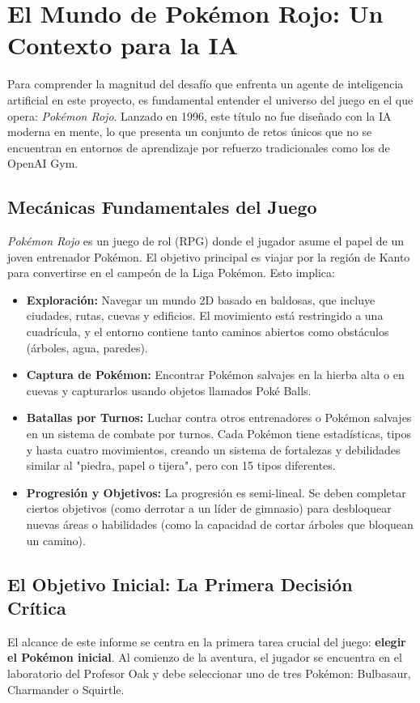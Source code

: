 \documentclass[12pt, oneside, openany]{book}
\begin{document}
\section{El Mundo de Pokémon Rojo: Un Contexto para la IA}
\label{sec:contexto_pokemon}

Para comprender la magnitud del desafío que enfrenta un agente de inteligencia artificial en este proyecto, es fundamental entender el universo del juego en el que opera: \textit{Pokémon Rojo}. Lanzado en 1996, este título no fue diseñado con la IA moderna en mente, lo que presenta un conjunto de retos únicos que no se encuentran en entornos de aprendizaje por refuerzo tradicionales como los de OpenAI Gym.

\subsection{Mecánicas Fundamentales del Juego}
\textit{Pokémon Rojo} es un juego de rol (RPG) donde el jugador asume el papel de un joven entrenador Pokémon. El objetivo principal es viajar por la región de Kanto para convertirse en el campeón de la Liga Pokémon. Esto implica:
\begin{itemize}
    \item \textbf{Exploración:} Navegar un mundo 2D basado en baldosas, que incluye ciudades, rutas, cuevas y edificios. El movimiento está restringido a una cuadrícula, y el entorno contiene tanto caminos abiertos como obstáculos (árboles, agua, paredes).
    \item \textbf{Captura de Pokémon:} Encontrar Pokémon salvajes en la hierba alta o en cuevas y capturarlos usando objetos llamados Poké Balls.
    \item \textbf{Batallas por Turnos:} Luchar contra otros entrenadores o Pokémon salvajes en un sistema de combate por turnos. Cada Pokémon tiene estadísticas, tipos y hasta cuatro movimientos, creando un sistema de fortalezas y debilidades similar al "piedra, papel o tijera", pero con 15 tipos diferentes.
    \item \textbf{Progresión y Objetivos:} La progresión es semi-lineal. Se deben completar ciertos objetivos (como derrotar a un líder de gimnasio) para desbloquear nuevas áreas o habilidades (como la capacidad de cortar árboles que bloquean un camino).
\end{itemize}

\subsection{El Objetivo Inicial: La Primera Decisión Crítica}
El alcance de este informe se centra en la primera tarea crucial del juego: \textbf{elegir el Pokémon inicial}. Al comienzo de la aventura, el jugador se encuentra en el laboratorio del Profesor Oak y debe seleccionar uno de tres Pokémon: Bulbasaur, Charmander o Squirtle.
\end{document}
